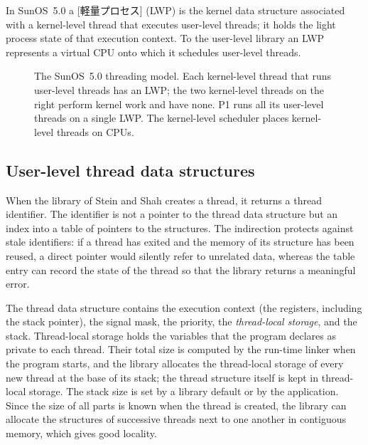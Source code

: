 \documentclass[../main.tex]{subfiles}
\begin{document}
\begin{definition}
  In SunOS~5.0 a [軽量プロセス]%
   (LWP) is the kernel data structure
  associated with a kernel-level thread that executes user-level threads;
  it holds the light process state of that execution context.  To the
  user-level library an LWP represents a virtual CPU onto which it
  schedules user-level threads.
\end{definition}

\begin{figure}[htbp]
  \centering
  
  \caption{The SunOS~5.0 threading model.  Each kernel-level thread that
    runs user-level threads has an LWP; the two kernel-level threads on the
    right perform kernel work and have none.  P1 runs all its user-level
    threads on a single LWP.  The kernel-level scheduler places
    kernel-level threads on CPUs.}
  \label{fig:l05-sunos}
\end{figure}

\subsection{User-level thread data structures}

When the library of Stein and Shah creates a thread, it returns a thread
identifier.  The identifier is not a pointer to the thread data structure
but an index into a table of pointers to the structures.  The indirection
protects against stale identifiers: if a thread has exited and the memory
of its structure has been reused, a direct pointer would silently refer to
unrelated data, whereas the table entry can record the state of the thread
so that the library returns a meaningful error.

The thread data structure contains the execution context (the registers,
including the stack pointer), the signal mask, the priority, the
\emph{thread-local storage}, and the stack.  Thread-local storage holds the
variables that the program declares as private to each thread.  Their
total size is computed by the run-time linker when the program starts, and
the library allocates the thread-local storage of every new thread at the
base of its stack; the thread structure itself is kept in thread-local
storage.  The stack size is set by a library default or by the
application.  Since the size of all parts is known when the thread is
created, the library can allocate the structures of successive threads
next to one another in contiguous memory, which gives good locality.
\end{document}
